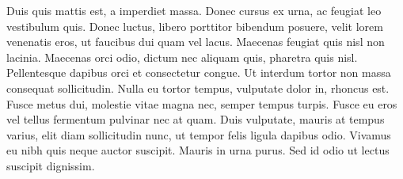 \documentclass[german,nofoldingmark,justify]{tfbrief}
\begin{document}
\begin{letter}

%
%

Duis quis mattis est, a imperdiet massa. Donec cursus ex urna, ac feugiat leo vestibulum quis. Donec luctus, libero porttitor bibendum posuere, velit lorem venenatis eros, ut faucibus dui quam vel lacus. Maecenas feugiat quis nisl non lacinia. Maecenas orci odio, dictum nec aliquam quis, pharetra quis nisl. Pellentesque dapibus orci et consectetur congue. Ut interdum tortor non massa consequat sollicitudin. Nulla eu tortor tempus, vulputate dolor in, rhoncus est. Fusce metus dui, molestie vitae magna nec, semper tempus turpis. Fusce eu eros vel tellus fermentum pulvinar nec at quam. Duis vulputate, mauris at tempus varius, elit diam sollicitudin nunc, ut tempor felis ligula dapibus odio. Vivamus eu nibh quis neque auctor suscipit. Mauris in urna purus. Sed id odio ut lectus suscipit dignissim.

\end{letter}
\end{document}
